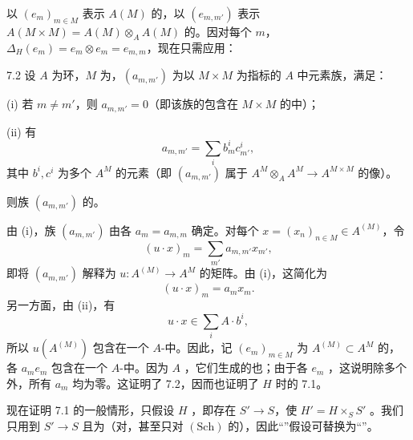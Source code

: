 以 $(e_m)_{m\in M}$ 表示 $A(M)$ 的，以 $(e_{m,m'})$ 表示 $A(M\times M)=A(M)\otimes_A A(M)$ 的。因对每个 $m$，$\Delta_H(e_m)=e_m\otimes e_m=e_{m,m}$，现在只需应用：
\begin{SGAresult}{}{7.2}
设 $A$ 为环，$M$ 为，$(a_{m,m'})$ 为以 $M\times M$ 为指标的 $A$ 中元素族，满足：

 (i) 若 $m\ne m'$，则 $a_{m,m'}=0$（即该族的包含在 $M\times M$ 的中）；

 (ii) 有
\[a_{m,m'}=\sum_i b_m^i c_{m'}^i,\]
其中 $b^i,c^i$ 为多个 $A^M$ 的元素（即 $(a_{m,m'})$ 属于 $A^M\otimes_A A^M\to A^{M\times M}$ 的像）。

则族 $(a_{m,m'})$ 的。
\end{SGAresult}
由 (i)，族 $(a_{m,m'})$ 由各 $a_m=a_{m,m}$ 确定。对每个 $x=(x_n)_{n\in M}\in A^{(M)}$，令
\[(u\cdot x)_m=\sum_{m'}a_{m,m'}x_{m'},\]
即将 $(a_{m,m'})$ 解释为 $u:A^{(M)}\to A^M$ 的矩阵。由 (i)，这简化为
\[(u\cdot x)_m=a_mx_m.\]
另一方面，由 (ii)，有
\[u\cdot x\in\sum_i A\cdot b^i,\]
所以 $u(A^{(M)})$ 包含在一个 $A$-中。因此，记 $(e_m)_{m\in M}$ 为 $A^{(M)}\subset A^M$ 的，各 $a_me_m$ 包含在一个 $A$-中。因为 $A$ ，它们生成的也；由于各 $e_m$ ，这说明除多个外，所有 $a_m$ 均为零。这证明了 7.2，因而也证明了 $H$ 时的 7.1。

现在证明 7.1 的一般情形，只假设 $H$ ，即存在 $S'\to S$，使 $H'=H\times_S S'$ 。我们只用到 $S'\to S$ 且为（对，甚至只对 $(\mathrm{Sch})$ 的），因此“”假设可替换为“”。

